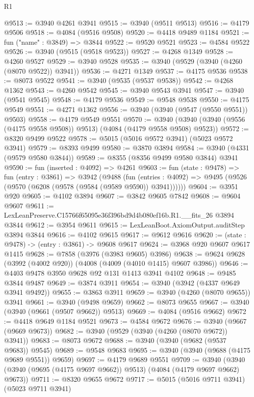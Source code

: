 \begin{lexlean}{R1}
\begin{coremodule}
@9513 := @3940 @4261 @3941
@9515 := @3940 (@9511 @9513)
@9516 := @4179 @9506
@9518 := @4084 (@9516 @9508)
@9520 := @4418 @9489 @1184
@9521 := fun ("name" : @3849) => @3844
@9522 := @9520 @9521
@9523 := @4584 @9522
@9526 := @3940 (@9515 (@9518 @9523))
@9527 := @4268 @1349
@9528 := @4260 @9527
@9529 := @3940 @9528
@9535 := @3940 (@9529 (@3940 (@4260 (@8070 @9522)) @3941))
@9536 := @4271 @1349
@9537 := @4175 @9536
@9538 := @8073 @9522
@9541 := @3940 (@9535 (@9537 @9538))
@9542 := @4268 @1362
@9543 := @4260 @9542
@9545 := @3940 @9543 @3941
@9547 := @3940 (@9541 @9545)
@9548 := @4179 @9536
@9549 := @9548 @9538
@9550 := @4175 @9549
@9551 := @4271 @1362
@9556 := @3940 (@3940 (@9547 (@9550 @9551)) @9503)
@9558 := @4179 @9549 @9551
@9570 := @3940 (@3940 (@3940 (@9556 (@4175 @9558 @9508)) @9513) (@4084 (@4179 @9558 @9508) @9523))
@9572 := @8320 @9499 @9522
@9578 := @5015 (@5016 @9572 @3941) (@5023 @9572 @3941)
@9579 := @8393 @9499
@9580 := @3870 @3894
@9584 := @3940 (@4331 (@9579 @9580 @3844))
@9589 := @8355 (@8356 @9499 @9580 @3844) @3941
@9590 := fun (inserted : @4092) => @4261
@9603 := fun (state : @9478) =>
  fun (entry : @3861) =>
  @3942
    (@9488
      (fun (entries : @4092) => @9495 (@9526 (@9570 (@6208 (@9578 (@9584 (@9589 @9590)) @3941))))))
@9604 := @3951 @920
@9605 := @4102 @3894
@9607 := @3842 @9605 @7842
@9608 := @9604 @9607
@9611 := LexLeanPreserve.C15766f65095e36f396bd9d4b080ef16b.R1.__fits_26 @3894 @3844
@9612 := @3954 @9611
@9615 := LexLeanBoot.AxiomOutput.auditStep @3894 @3844
@9616 := @4102 @9615
@9617 := @9612 @9616
@9620 := (state : @9478) -> (entry : @3861) -> @9608 @9617
@9624 := @3968 @920 @9607 @9617 @1415
@9628 := @7858 (@3976 (@3983 @9605) @3986)
@9638 := @9624 @9628 (@3992 (@4002 @920)) (@4008 (@4009 (@4010 @1415) @9607 @3986))
@9646 := @4403 @9478 @3950 @9628 @92 @131 @1413 @3941 @4102
@9648 := @9485 @3844 @9487
@9649 := @3874 @3911
@9654 := @3940 (@3942 (@4337 @9649 @3941 @9492))
@9655 := @3863 @3911
@9659 := @3940 (@4260 (@8070 @9655)) @3941
@9661 := @3940 (@9498 @9659)
@9662 := @8073 @9655
@9667 := @3940 (@3940 (@9661 (@9507 @9662)) @9513)
@9669 := @4084 (@9516 @9662)
@9672 := @4418 @9649 @1184 @9521
@9673 := @4584 @9672
@9676 := @3940 (@9667 (@9669 @9673))
@9682 := @3940 (@9529 (@3940 (@4260 (@8070 @9672)) @3941))
@9683 := @8073 @9672
@9688 := @3940 (@3940 (@9682 (@9537 @9683)) @9545)
@9689 := @9548 @9683
@9695 := @3940 (@3940 (@9688 (@4175 @9689 @9551)) @9659)
@9697 := @4179 @9689 @9551
@9709 := @3940 (@3940 (@3940 (@9695 (@4175 @9697 @9662)) @9513) (@4084 (@4179 @9697 @9662) @9673))
@9711 := @8320 @9655 @9672
@9717 := @5015 (@5016 @9711 @3941) (@5023 @9711 @3941)

\end{coremodule}
\end{lexlean}
